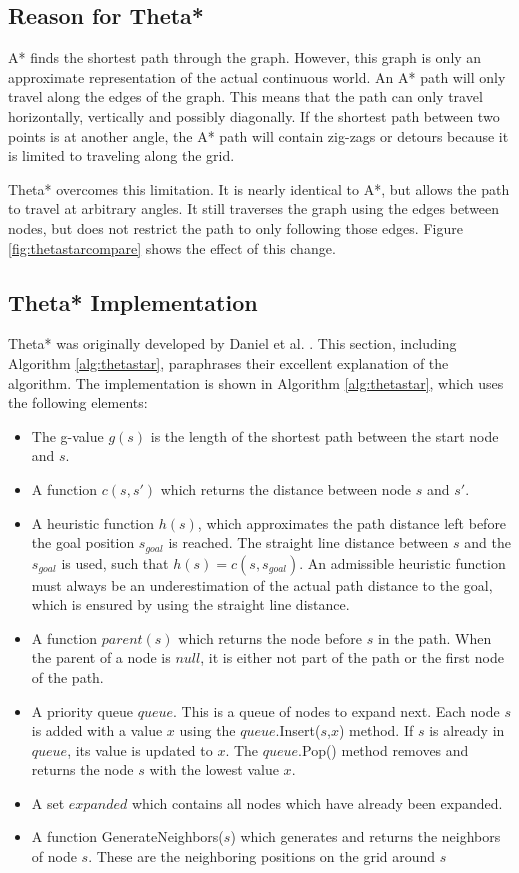 \subsection{Reason for Theta*}
A* finds the shortest path through the graph. However, this graph is only an approximate representation of the actual continuous world. An A* path will only travel along the edges of the graph. This means that the path can only travel horizontally, vertically and possibly diagonally. If the shortest path between two points is at another angle, the A* path will contain zig-zags or detours because it is limited to traveling along the grid. 
\par
Theta* overcomes this limitation. It is nearly identical to A*, but  allows the path to travel at arbitrary angles. It still traverses the graph using the edges between nodes, but does not restrict the path to only following those edges. Figure \ref{fig:thetastarcompare} shows the effect of this change.




\subsection{Theta* Implementation}

Theta* was originally developed by Daniel et al. \cite{Daniel2010}. This section, including Algorithm \ref{alg:thetastar}, paraphrases their excellent explanation of the algorithm. The implementation is shown in Algorithm \ref{alg:thetastar}, which uses the following elements:
\begin{itemize}
\item The g-value $g(s)$ is the length of the shortest path between the start node and $s$.
\item A function $c(s,s')$ which returns the distance between node $s$ and $s'$.
\item A heuristic function $h(s)$, which approximates the path distance left before the goal position $s_{goal}$ is reached. The straight line distance between $s$ and the $s_{goal}$ is used, such that $h(s) = c(s,s_{goal})$. An admissible heuristic function must always be an underestimation of the actual path distance to the goal, which is ensured by using the straight line distance. 
\item A function $parent(s)$ which returns the node before $s$ in the path. When the parent of a node is $null$, it is either not part of the path or the first node of the path.
\item A priority queue $queue$. This is a queue of nodes to expand next. Each node $s$ is added with a value $x$ using the $queue.$Insert($s$,$x$) method. If $s$ is already in $queue$, its value is updated to $x$. The $queue$.Pop() method removes and returns the node $s$ with the lowest value $x$.
\item A set $expanded$ which contains all nodes which have already been expanded.
\item A function GenerateNeighbors($s$) which generates and returns the neighbors of node $s$. These are the neighboring positions on the grid around $s$
\end{itemize}


